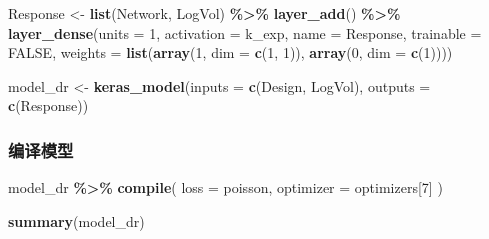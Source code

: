 \documentclass[
]{article}
\newenvironment{Shaded}{\begin{snugshade}}{\end{snugshade}}
\newcommand{\AttributeTok}[1]{\textcolor[rgb]{0.13,0.29,0.53}{#1}}
\newcommand{\ConstantTok}[1]{\textcolor[rgb]{0.56,0.35,0.01}{#1}}
\newcommand{\DecValTok}[1]{\textcolor[rgb]{0.00,0.00,0.81}{#1}}
\newcommand{\FunctionTok}[1]{\textcolor[rgb]{0.13,0.29,0.53}{\textbf{#1}}}
\newcommand{\NormalTok}[1]{#1}
\newcommand{\OtherTok}[1]{\textcolor[rgb]{0.56,0.35,0.01}{#1}}
\newcommand{\SpecialCharTok}[1]{\textcolor[rgb]{0.81,0.36,0.00}{\textbf{#1}}}
\newcommand{\StringTok}[1]{\textcolor[rgb]{0.31,0.60,0.02}{#1}}
\begin{document}
\begin{Shaded}
\begin{Highlighting}[]
\NormalTok{Response }\OtherTok{\textless{}{-}} \FunctionTok{list}\NormalTok{(Network, LogVol) }\SpecialCharTok{\%\textgreater{}\%}
  \FunctionTok{layer\_add}\NormalTok{() }\SpecialCharTok{\%\textgreater{}\%} 
  \FunctionTok{layer\_dense}\NormalTok{(}\AttributeTok{units =} \DecValTok{1}\NormalTok{, }\AttributeTok{activation =}\NormalTok{ k\_exp, }\AttributeTok{name =} \StringTok{\textquotesingle{}Response\textquotesingle{}}\NormalTok{, }\AttributeTok{trainable =} \ConstantTok{FALSE}\NormalTok{, }
              \AttributeTok{weights =} \FunctionTok{list}\NormalTok{(}\FunctionTok{array}\NormalTok{(}\DecValTok{1}\NormalTok{, }\AttributeTok{dim =} \FunctionTok{c}\NormalTok{(}\DecValTok{1}\NormalTok{, }\DecValTok{1}\NormalTok{)), }\FunctionTok{array}\NormalTok{(}\DecValTok{0}\NormalTok{, }\AttributeTok{dim =} \FunctionTok{c}\NormalTok{(}\DecValTok{1}\NormalTok{))))}

\NormalTok{model\_dr }\OtherTok{\textless{}{-}} \FunctionTok{keras\_model}\NormalTok{(}\AttributeTok{inputs =} \FunctionTok{c}\NormalTok{(Design, LogVol), }\AttributeTok{outputs =} \FunctionTok{c}\NormalTok{(Response))}
\end{Highlighting}
\end{Shaded}

\subsubsection{编译模型}\label{ux7f16ux8bd1ux6a21ux578b-2}

\begin{Shaded}
\begin{Highlighting}[]
\NormalTok{model\_dr }\SpecialCharTok{\%\textgreater{}\%} \FunctionTok{compile}\NormalTok{(}
  \AttributeTok{loss =} \StringTok{\textquotesingle{}poisson\textquotesingle{}}\NormalTok{,}
  \AttributeTok{optimizer =}\NormalTok{ optimizers[}\DecValTok{7}\NormalTok{]}
\NormalTok{)}

\FunctionTok{summary}\NormalTok{(model\_dr)}
\end{Highlighting}
\end{Shaded}
\end{document}
